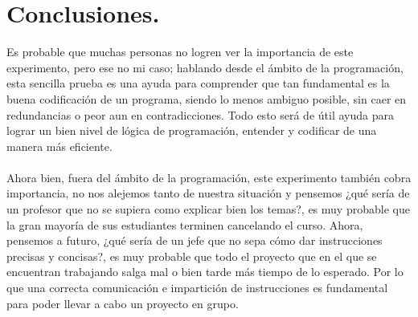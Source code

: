 \documentclass{article}
\begin{document}
\section{Conclusiones.} \label{imagenes}
Es probable que muchas personas no logren ver la importancia de este experimento, pero ese no mi caso; hablando desde el ámbito de la programación, esta sencilla prueba es una ayuda para comprender que tan fundamental es la buena codificación de un programa, siendo lo menos ambiguo posible, sin caer en redundancias o peor aun en contradicciones. Todo esto será de útil ayuda para lograr un bien nivel de lógica de programación, entender y codificar de una manera más eficiente.
\\
\\
Ahora bien, fuera del ámbito de la programación, este experimento también cobra importancia, no nos alejemos tanto de nuestra situación y pensemos ¿qué sería de un profesor que no se supiera como explicar bien los temas?, es muy probable que la gran mayoría de sus estudiantes terminen cancelando el curso. Ahora, pensemos a futuro, ¿qué sería de un jefe que no sepa cómo dar instrucciones precisas y concisas?, es muy probable que todo el proyecto que en el que se encuentran trabajando salga mal o bien tarde más tiempo de lo esperado. Por lo que una correcta comunicación e impartición de instrucciones es fundamental para poder llevar a cabo un proyecto en grupo.
\end{document}
